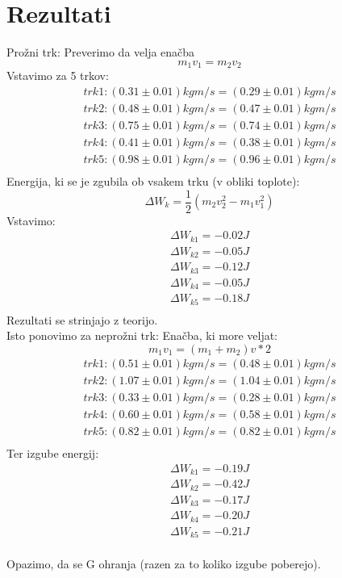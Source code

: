 \documentclass[11pt]{article}
\begin{document}
    \section{Rezultati}
    Prožni trk:
    Preverimo da velja enačba
    \[
        m_1 v_1 = m_2 v_2
    \]
    Vstavimo za 5 trkov:
    \begin{align*}
        trk 1: (0.31 \pm 0.01) kg m/s = (0.29 \pm 0.01) kg m/s \\
        trk 2: (0.48 \pm 0.01) kg m/s = (0.47 \pm 0.01) kg m/s \\
        trk 3: (0.75 \pm 0.01) kg m/s = (0.74 \pm 0.01) kg m/s \\
        trk 4: (0.41 \pm 0.01) kg m/s = (0.38 \pm 0.01) kg m/s \\
        trk 5: (0.98 \pm 0.01) kg m/s = (0.96 \pm 0.01) kg m/s \\
    \end{align*}
    Energija, ki se je zgubila ob vsakem trku (v obliki toplote):
    \[
        \Delta W_k = \frac{1}{2}(m_2 v_2^2 - m_1 v_1^2)
    \]
    Vstavimo:
    \begin{align*}
        \Delta W_{k1} = -0.02 J \\
        \Delta W_{k2} = -0.05 J \\
        \Delta W_{k3} = -0.12 J \\
        \Delta W_{k4} = -0.05 J \\
        \Delta W_{k5} = -0.18 J \\
    \end{align*}
    Rezultati se strinjajo z teorijo.
    \\
    Isto ponovimo za neprožni trk:
    Enačba, ki more veljat:
    \[
        m_1 v_1 = (m_1 + m_2) v*2
    \]
    \begin{align*}
        trk 1: (0.51 \pm 0.01) kg m/s = (0.48 \pm 0.01) kg m/s \\
        trk 2: (1.07 \pm 0.01) kg m/s = (1.04 \pm 0.01) kg m/s \\
        trk 3: (0.33 \pm 0.01) kg m/s = (0.28 \pm 0.01) kg m/s \\
        trk 4: (0.60 \pm 0.01) kg m/s = (0.58 \pm 0.01) kg m/s \\
        trk 5: (0.82 \pm 0.01) kg m/s = (0.82 \pm 0.01) kg m/s \\
    \end{align*}
    Ter izgube energij:
    \begin{align*}
        \Delta W_{k1} = -0.19 J \\
        \Delta W_{k2} = -0.42 J \\
        \Delta W_{k3} = -0.17 J \\
        \Delta W_{k4} = -0.20 J \\
        \Delta W_{k5} = -0.21 J \\
    \end{align*}

    Opazimo, da se G ohranja (razen za to koliko izgube poberejo).
\end{document}
